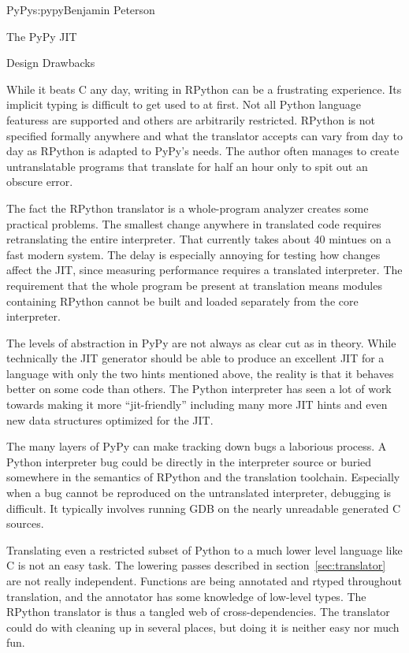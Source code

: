 \begin{aosachapter}{PyPy}{s:pypy}{Benjamin Peterson}
\begin{aosasect1}{The PyPy JIT}
\end{aosasect1}

\begin{aosasect1}{Design Drawbacks}
\label{sec:drawbacks}

While it beats C any day, writing in RPython can be a frustrating
experience. Its implicit typing is difficult to get used to at first. Not all
Python language featuress are supported and others are arbitrarily
restricted. RPython is not specified formally anywhere and what the translator
accepts can vary from day to day as RPython is adapted to PyPy's needs. The
author often manages to create untranslatable programs that translate for half
an hour only to spit out an obscure error.

The fact the RPython translator is a whole-program analyzer creates some
practical problems. The smallest change anywhere in translated code requires
retranslating the entire interpreter. That currently takes about 40 mintues on a
fast modern system. The delay is especially annoying for testing how changes
affect the JIT, since measuring performance requires a translated
interpreter. The requirement that the whole program be present at translation
means modules containing RPython cannot be built and loaded separately from the
core interpreter.

The levels of abstraction in PyPy are not always as clear cut as in
theory. While technically the JIT generator should be able to produce an
excellent JIT for a language with only the two hints mentioned above, the
reality is that it behaves better on some code than others. The Python
interpreter has seen a lot of work towards making it more ``jit-friendly''
including many more JIT hints and even new data structures optimized for the
JIT.

The many layers of PyPy can make tracking down bugs a laborious process. A
Python interpreter bug could be directly in the interpreter source or buried
somewhere in the semantics of RPython and the translation toolchain. Especially
when a bug cannot be reproduced on the untranslated interpreter, debugging is
difficult. It typically involves running GDB on the nearly unreadable generated
C sources.

Translating even a restricted subset of Python to a much lower level language
like C is not an easy task. The lowering passes described in
section~\ref{sec:translator} are not really independent. Functions are being
annotated and rtyped throughout translation, and the annotator has some
knowledge of low-level types. The RPython translator is thus a tangled web of
cross-dependencies. The translator could do with cleaning up in several places,
but doing it is neither easy nor much fun.


\end{aosasect1}
\end{aosachapter}
